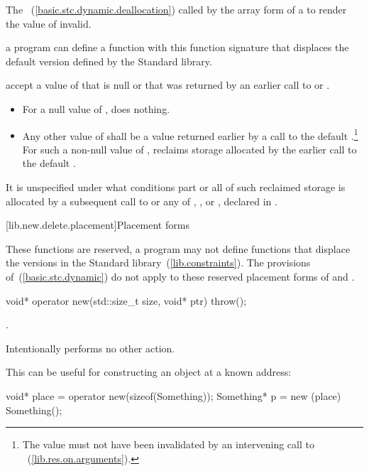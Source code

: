 \begin{itemdescr}
\pnum
\effects
The
~(\ref{basic.stc.dynamic.deallocation})
called by the array form of a
to render the value of  invalid.

\pnum
\replaceable
a \Cpp program can define a function with this
function signature that displaces the default version defined by the
\Cpp Standard library.

\pnum
\required
accept a value of  that is null or that was returned by an earlier
call to
or
.

\pnum
{}
\begin{itemize}
\item For a null value of , does nothing.
\item Any other value of  shall be a value returned earlier by a
call to the default .\footnote{The value
must not have been invalidated by an intervening call to
~(\ref{lib.res.on.arguments}).}
For such a non-null value of , reclaims storage allocated by the
earlier call to the default .
\end{itemize}

\pnum
It is unspecified under what conditions part or all of such reclaimed
storage is allocated by a subsequent call to
or any of
,
, or
,
declared in
.
\end{itemdescr}

[lib.new.delete.placement]{Placement forms}

\pnum
These functions are reserved, a \Cpp program may not define functions that displace
the versions in the Standard \Cpp library~(\ref{lib.constraints}).
The provisions of~(\ref{basic.stc.dynamic}) do not apply to these reserved
placement forms of  and .

%
\begin{itemdecl}
void* operator new(std::size_t size, void* ptr) throw();
\end{itemdecl}

\begin{itemdescr}
\pnum
\returns
{}.

\pnum
\notes
Intentionally performs no other action.

\pnum
\enterexample
This can be useful for constructing an object at a known address:

\begin{codeblock}
void* place = operator new(sizeof(Something));
Something* p = new (place) Something();
\end{codeblock}
\exitexampleb
\end{itemdescr}

